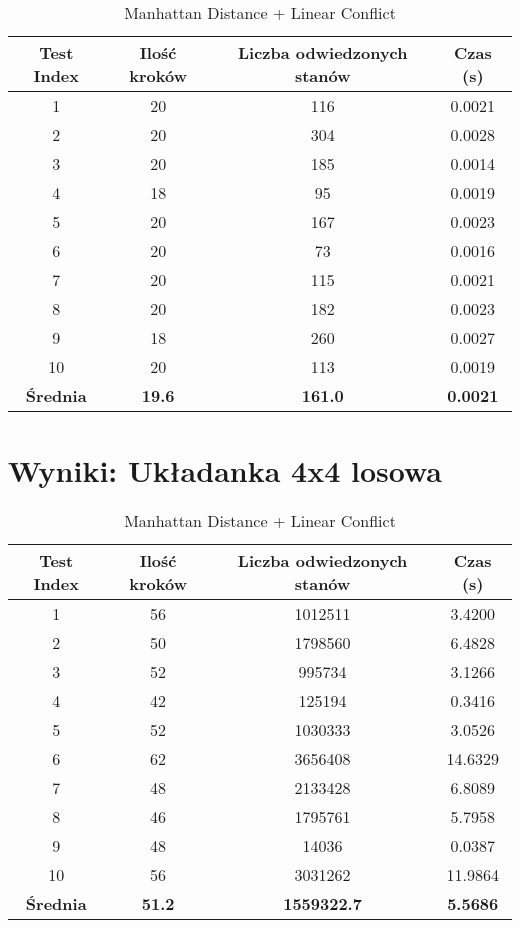 \documentclass{article}
\begin{document}
\begin{table}[H]
\centering
\caption{Manhattan Distance + Linear Conflict}
\begin{tabular}{|c|c|c|c|}
\hline
Test Index & Ilość kroków & Liczba odwiedzonych stanów & Czas (s) \\ \hline
1 & 20 & 116 & 0.0021 \\ \hline
2 & 20 & 304 & 0.0028 \\ \hline
3 & 20 & 185 & 0.0014 \\ \hline
4 & 18 & 95 & 0.0019 \\ \hline
5 & 20 & 167 & 0.0023 \\ \hline
6 & 20 & 73 & 0.0016 \\ \hline
7 & 20 & 115 & 0.0021 \\ \hline
8 & 20 & 182 & 0.0023 \\ \hline
9 & 18 & 260 & 0.0027 \\ \hline
10 & 20 & 113 & 0.0019 \\ \hline
\textbf{\textbf{Średnia}} & \textbf{19.6} & \textbf{161.0} & \textbf{0.0021} \\ \hline
\end{tabular}
\end{table}

\section{Wyniki: Układanka 4x4 losowa}
\begin{table}[H]
\centering
\caption{Manhattan Distance + Linear Conflict}
\begin{tabular}{|c|c|c|c|}
\hline
Test Index & Ilość kroków & Liczba odwiedzonych stanów & Czas (s) \\ \hline
1 & 56 & 1012511 & 3.4200 \\ \hline
2 & 50 & 1798560 & 6.4828 \\ \hline
3 & 52 & 995734 & 3.1266 \\ \hline
4 & 42 & 125194 & 0.3416 \\ \hline
5 & 52 & 1030333 & 3.0526 \\ \hline
6 & 62 & 3656408 & 14.6329 \\ \hline
7 & 48 & 2133428 & 6.8089 \\ \hline
8 & 46 & 1795761 & 5.7958 \\ \hline
9 & 48 & 14036 & 0.0387 \\ \hline
10 & 56 & 3031262 & 11.9864 \\ \hline
\textbf{\textbf{Średnia}} & \textbf{51.2} & \textbf{1559322.7} & \textbf{5.5686} \\ \hline
\end{tabular}
\end{table}
\end{document}
